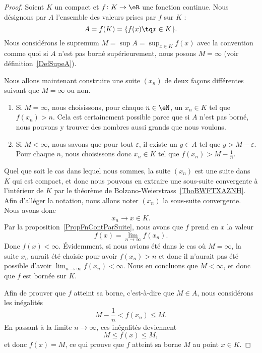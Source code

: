 \begin{proof}
	Soient \( K\) un compact et $f\colon K\to \eR$ une fonction continue. Nous désignons par $A$ l'ensemble des valeurs prises par $f$ sur $K$ :
	\begin{equation}
		A=f(K)=\{ f(x)\tq x\in K \}.
	\end{equation}
	Nous considérons le supremum $M=\sup A=\sup_{x\in K}f(x)$ avec la convention comme quoi si $A$ n'est pas borné supérieurement, nous posons $M=\infty$ (voir définition~\ref{DefSupeA}).

	Nous allons maintenant construire une suite $(x_n)$ de deux façons différentes suivant que $M=\infty$ ou non.
	\begin{enumerate}
		\item
			Si $M=\infty$, nous choisissons, pour chaque $n\in\eN$, un $x_n\in K$ tel que $f(x_n)>n$. Cela est certainement possible parce que si $A$ n'est pas borné, nous pouvons y trouver des nombres aussi grands que nous voulons.
		\item
			Si $M<\infty$, nous savons que pour tout $\varepsilon$, il existe un $y\in A$ tel que $y>M-\varepsilon$. Pour chaque $n$, nous choisissons donc $x_n\in K$ tel que $f(x_n)>M-\frac{1}{ n }$.
	\end{enumerate}
    Quel que soit le cas dans lequel nous sommes, la suite $(x_n)$ est une suite dans $K$ qui est compact, et donc nous pouvons en extraire une sous-suite convergente à l'intérieur de \( K\) par le théorème de Bolzano-Weierstrass~\ref{ThoBWFTXAZNH}. Afin d'alléger la notation, nous allons noter $(x_n)$ la sous-suite convergente. Nous avons donc
	\begin{equation}
		x_n\to x\in K.
	\end{equation}
	Par la proposition~\ref{PropFnContParSuite}, nous avons que $f$ prend en \( x\) la valeur
	\begin{equation}
		f(x)=\lim_{n\to \infty} f(x_n).
	\end{equation}
	Donc $f(x)<\infty$. Évidemment, si nous avions été dans le cas où $M=\infty$, la suite $x_n$ aurait été choisie pour avoir $f(x_n)>n$ et donc il n'aurait pas été possible d'avoir $\lim_{n\to \infty} f(x_n)<\infty$. Nous en concluons que $M<\infty$, et donc que $f$ est bornée sur $K$.

	Afin de prouver que $f$ atteint sa borne, c'est-à-dire que $M\in A$, nous considérons les inégalités
	\begin{equation}
		M-\frac{1}{ n }<f(x_n)\leq M.
	\end{equation}
	En passant à la limite $n\to \infty$, ces inégalités deviennent
	\begin{equation}
		M\leq f(x)\leq M,
	\end{equation}
	et donc $f(x)=M$, ce qui prouve que $f$ atteint sa borne $M$ au point $x\in K$.
\end{proof}

